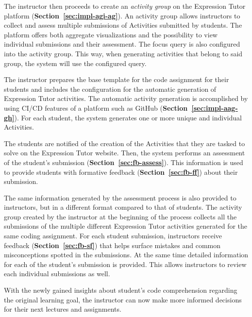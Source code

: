 \begin{chapterBody}
The instructor then proceeds to create an \textit{activity group} on the
Expression Tutor platform (\textbf{Section~\ref{sec:impl-agi-ag}}).
An activity group allows instructors to collect and assess multiple
submissions of Activities submitted by students. The platform offers both
aggregate visualizations and the possibility to view individual submissions
and their assessment. The focus query is also configured into the activity
group. This way, when generating activities that belong to said group, the
system will use the configured query.

The instructor prepares the base template for the code assignment for their
students and includes the configuration for the automatic generation of
Expression Tutor activities. The automatic activity generation is accomplished
by using CI/CD features of a platform such as GitHub 
(\textbf{Section~\ref{sec:impl-aag-gh}}).
For each student, the system generates one or more unique and individual
Activities.

The students are notified of the creation of the Activities that they are tasked
to solve on the Expression Tutor website. Then, the system performs an assessment
of the student's submission (\textbf{Section~\ref{sec:fb-assess}}).
This information is used to provide students with formative feedback
(\textbf{Section~\ref{sec:fb-ff}}) about their submission.

The same information generated by the assessment process is also provided to
instructors, but in a different format compared to that of students.
The activity group created by the instructor at the beginning of the process
collects all the submissions of the multiple different Expression Tutor
activities generated for the same coding assignment.
For each student submission, instructors receive feedback
(\textbf{Section~\ref{sec:fb-sf}}) that helps surface mistakes and common
misconceptions spotted in the submissions. At the same time detailed information
for each of the student's submission is provided. This allows instructors to
review each individual submissions as well.

With the newly gained insights about student's code comprehension regarding the
original learning goal, the instructor can now make more informed decisions for
their next lectures and assignments.

\end{chapterBody}